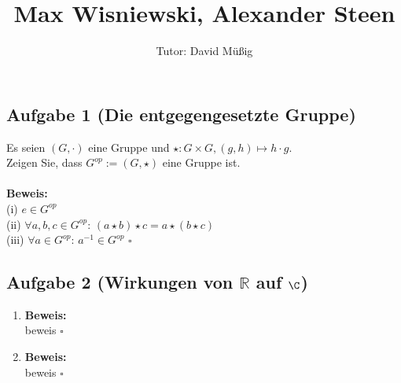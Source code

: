 \documentclass[11pt,a4paper,ngerman]{article}
\author{Tutor: David Müßig}
\date{}
\title{Max Wisniewski, Alexander Steen}
\newcommand{\R}{\mathbb{R}}
\begin{document}

\maketitle
\thispagestyle{fancy}


\subsection*{Aufgabe 1 \mdseries (Die entgegengesetzte Gruppe)}
Es seien $(G, \cdot)$ eine Gruppe und $\star : G \times G, (g,h) \mapsto h \cdot g$. \\
Zeigen Sie, dass $G^{op} := (G, \star)$ eine Gruppe ist. \\ \\
\textbf{Beweis:}\\
(i) $e \in G^{op}$ \\
(ii) $\forall a,b,c \in G^{op}:\,(a \star b) \star c = a \star (b \star c)$ \\
(iii) $\forall a \in G^{op}: \, a^{-1} \in G^{op}$
\mbox{} \hfill $\square$\\



\subsection*{Aufgabe 2 \mdseries (Wirkungen von $\R$ auf $\C$)}

\begin{enumerate}[\bfseries a)]
\item 
\textbf{Beweis:}\\
beweis
\mbox{} \hfill $\square$\\

\item 
\textbf{Beweis:}\\
beweis
\mbox{} \hfill $\square$\\
\end{enumerate}



\end{document}
